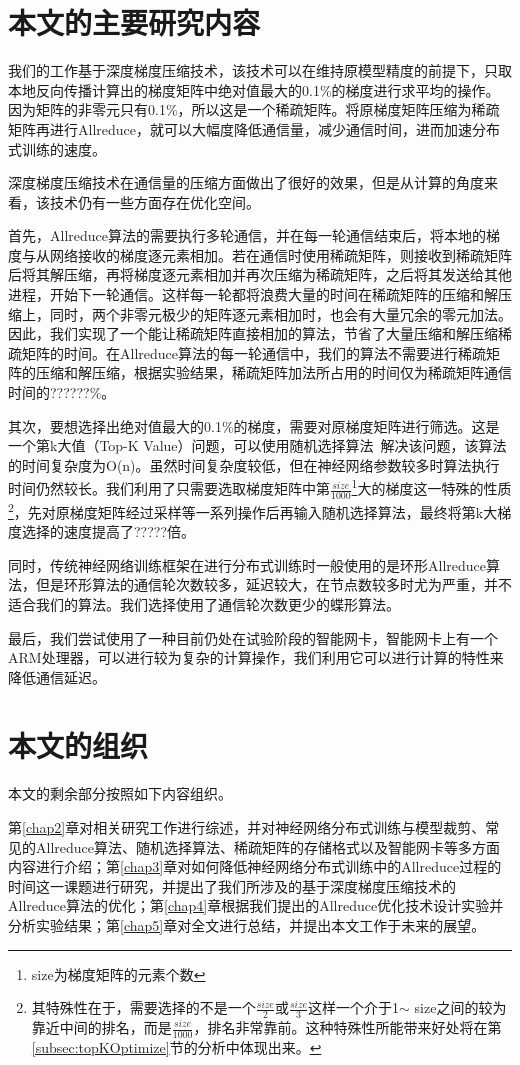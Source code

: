 \section{本文的主要研究内容}
我们的工作基于深度梯度压缩技术，该技术可以在维持原模型精度的前提下，只取本地反向传播计算出的梯度矩阵中绝对值最大的0.1\%的梯度进行求平均的操作。因为矩阵的非零元只有0.1\%，所以这是一个稀疏矩阵。将原梯度矩阵压缩为稀疏矩阵再进行Allreduce，就可以大幅度降低通信量，减少通信时间，进而加速分布式训练的速度。

深度梯度压缩技术在通信量的压缩方面做出了很好的效果，但是从计算的角度来看，该技术仍有一些方面存在优化空间。

首先，Allreduce算法的需要执行多轮通信，并在每一轮通信结束后，将本地的梯度与从网络接收的梯度逐元素相加。若在通信时使用稀疏矩阵，则接收到稀疏矩阵后将其解压缩，再将梯度逐元素相加并再次压缩为稀疏矩阵，之后将其发送给其他进程，开始下一轮通信。这样每一轮都将浪费大量的时间在稀疏矩阵的压缩和解压缩上，同时，两个非零元极少的矩阵逐元素相加时，也会有大量冗余的零元加法。因此，我们实现了一个能让稀疏矩阵直接相加的算法，节省了大量压缩和解压缩稀疏矩阵的时间。在Allreduce算法的每一轮通信中，我们的算法不需要进行稀疏矩阵的压缩和解压缩，根据实验结果，稀疏矩阵加法所占用的时间仅为稀疏矩阵通信时间的??????\%。

其次，要想选择出绝对值最大的0.1\%的梯度，需要对原梯度矩阵进行筛选。这是一个第k大值（Top-K Value）问题，可以使用随机选择算法~\cite{IntroToAlgo}解决该问题，该算法的时间复杂度为O(n)。虽然时间复杂度较低，但在神经网络参数较多时算法执行时间仍然较长。我们利用了只需要选取梯度矩阵中第$\frac{size}{1000}$\footnote{size为梯度矩阵的元素个数}大的梯度这一特殊的性质\footnote{其特殊性在于，需要选择的不是一个$\frac{size}{2}$或$\frac{size}{3}$这样一个介于1$\sim$ size之间的较为靠近中间的排名，而是$\frac{size}{1000}$，排名非常靠前。这种特殊性所能带来好处将在第\ref{subsec:topKOptimize}节的分析中体现出来。}，先对原梯度矩阵经过采样等一系列操作后再输入随机选择算法，最终将第k大梯度选择的速度提高了?????倍。

同时，传统神经网络训练框架在进行分布式训练时一般使用的是环形Allreduce算法，但是环形算法的通信轮次数较多，延迟较大，在节点数较多时尤为严重，并不适合我们的算法。我们选择使用了通信轮次数更少的蝶形算法。

最后，我们尝试使用了一种目前仍处在试验阶段的智能网卡，智能网卡上有一个ARM处理器，可以进行较为复杂的计算操作，我们利用它可以进行计算的特性来降低通信延迟。

\section{本文的组织}

本文的剩余部分按照如下内容组织。

第\ref{chap2}章对相关研究工作进行综述，并对神经网络分布式训练与模型裁剪、常见的Allreduce算法、随机选择算法、稀疏矩阵的存储格式以及智能网卡等多方面内容进行介绍；第\ref{chap3}章对如何降低神经网络分布式训练中的Allreduce过程的时间这一课题进行研究，并提出了我们所涉及的基于深度梯度压缩技术的Allreduce算法的优化；第\ref{chap4}章根据我们提出的Allreduce优化技术设计实验并分析实验结果；第\ref{chap5}章对全文进行总结，并提出本文工作于未来的展望。